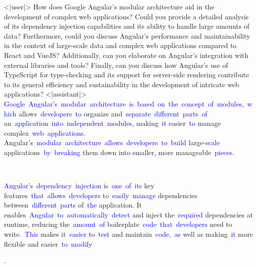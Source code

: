 \documentclass{article}
\begin{document}
\begin{tcolorbox}[colframe=black,colback=white]
<|user|>
How does Google Angular's modular architecture aid in the development of complex web applications? Could you provide a detailed analysis of its dependency injection capabilities and its ability to handle large amounts of data? Furthermore, could you discuss Angular's performance and maintainability in the context of large-scale data and complex web applications compared to React and VueJS? Additionally, can you elaborate on Angular's integration with external libraries and tools? Finally, can you discuss how Angular's use of TypeScript for type-checking and its support for server-side rendering contribute to its general efficiency and sustainability in the development of intricate web applications?
<|assistant|>
\textcolor{blue}{Google}\textcolor{blue}{~Angular}\textcolor{blue}{'s}\textcolor{blue}{~modular}\textcolor{blue}{~architecture}\textcolor{blue}{~is}\textcolor{blue}{~based}\textcolor{blue}{~on}\textcolor{blue}{~the}\textcolor{blue}{~concept}\textcolor{blue}{~of}\textcolor{blue}{~modules}\textcolor{blue}{,}\textcolor{blue}{~which} allows\textcolor{blue}{~developers}\textcolor{blue}{~to} organize and\textcolor{blue}{~separate}\textcolor{blue}{~different}\textcolor{blue}{~parts}\textcolor{blue}{~of} an\textcolor{blue}{~application}\textcolor{blue}{~into}\textcolor{blue}{~independent}\textcolor{blue}{~modules}, making\textcolor{blue}{~it} easier\textcolor{blue}{~to} manage complex\textcolor{blue}{~web}\textcolor{blue}{~applications}\textcolor{blue}{.} Angular's\textcolor{blue}{~modular}\textcolor{blue}{~architecture}\textcolor{blue}{~allows}\textcolor{blue}{~developers}\textcolor{blue}{~to}\textcolor{blue}{~build} large\textcolor{blue}{-scale} applications\textcolor{blue}{~by}\textcolor{blue}{~breaking} them down into smaller, more manageable\textcolor{blue}{~pieces}.\textcolor{blue}{~

}\textcolor{blue}{Angular}'s\textcolor{blue}{~dependency}\textcolor{blue}{~injection} is\textcolor{blue}{~one}\textcolor{blue}{~of}\textcolor{blue}{~its} key features\textcolor{blue}{~that}\textcolor{blue}{~allows}\textcolor{blue}{~developers} to\textcolor{blue}{~easily}\textcolor{blue}{~manage} dependencies between\textcolor{blue}{~different}\textcolor{blue}{~parts} of\textcolor{blue}{~the} application\textcolor{blue}{.} It enables\textcolor{blue}{~Angular}\textcolor{blue}{~to}\textcolor{blue}{~automatically}\textcolor{blue}{~detect} and inject the\textcolor{blue}{~required} dependencies at runtime, reducing the\textcolor{blue}{~amount}\textcolor{blue}{~of} boilerplate\textcolor{blue}{~code}\textcolor{blue}{~that}\textcolor{blue}{~developers} need to write\textcolor{blue}{.}\textcolor{blue}{~This} makes it\textcolor{blue}{~easier} to\textcolor{blue}{~test} and maintain\textcolor{blue}{~code}\textcolor{blue}{,}\textcolor{blue}{~as} well as making\textcolor{blue}{~it} more flexible and easier\textcolor{blue}{~to}\textcolor{blue}{~modify}\textcolor{blue}{.

}
\end{tcolorbox}
\end{document}
